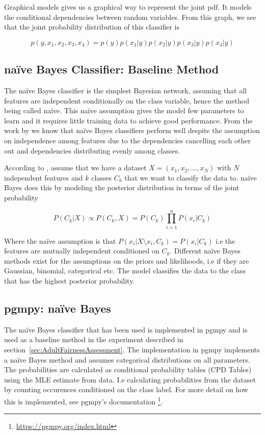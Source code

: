 Graphical models gives us a graphical way to represent the joint pdf. It models the conditional dependencies between random variables. From this graph, we see that the joint probability distribution of this classifier is

\begin{equation*}
    p(y, x_1, x_2, x_3, x_4) = p(y)p(x_1|y)p(x_2|y)p(x_3|y)p(x_4|y)
\end{equation*}

\subsection{naïve Bayes Classifier: Baseline Method}
\label{relatedwork:naïveBayes}
The naïve Bayes classifier is the simplest Bayesian network, assuming that all features are independent conditionally on the class variable, hence the method being called naïve. This naïve assumption gives the model few parameters to learn and it requires little training data to achieve good performance. From the work by \citet{Zhang:2004:AAAI} we know that naïve Bayes classifiers perform well despite the assumption on independence among features due to the dependencies cancelling each other out and dependencies distributing evenly among classes.

According to \citet[p.~217]{Ankan:2015:Book}, assume that we have a dataset $X = (x_1, x_2, \dots, x_N)$ with $N$ independent features and $k$ classes $C_k$ that we want to classify the data to. naïve Bayes does this by modeling the posterior distribution in terms of the joint probability

$$
P(C_k | X) \propto P(C_k , X) = P(C_k) \prod_{i=1}^{n} P(x_i|C_k)
$$

Where the naïve assumption is that $P(x_i | X \setminus x_i , C_k) = P(x_i | C_k)$ i.e the features are mutually independent conditioned on $C_k$. Different naïve Bayes methods exist for the assumptions on the priors and likelihoods, i.e if they are Gaussian, binomial, categorical etc. The model classifies the data to the class that has the highest posterior probability. 

\subsection{pgmpy: naïve Bayes}

The naïve Bayes classifier that has been used is implemented in pgmpy and is used as a baseline method in the experiment described in section~\ref{sec:AdultFairnessAssessment}. The implementation in pgmpy implements a naïve Bayes method and assumes categorical distributions on all parameters. The probabilities are calculated as conditional probability tables (CPD Tables) using the MLE estimate from data. I.e calculating probabilities from the dataset by counting occurences conditioned on the class label. For more detail on how this is implemented, see pgmpy's documentation \footnote{\url{https://pgmpy.org/index.html}}.

